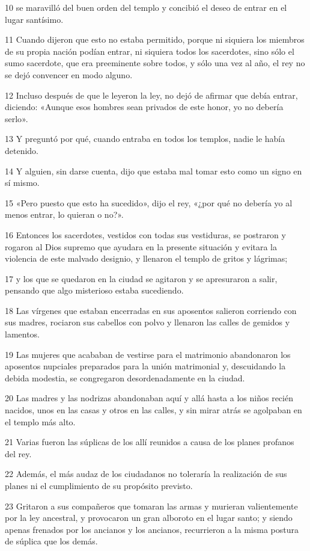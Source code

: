 \par 10 se maravilló del buen orden del templo y concibió el deseo de entrar en el lugar santísimo.
\par 11 Cuando dijeron que esto no estaba permitido, porque ni siquiera los miembros de su propia nación podían entrar, ni siquiera todos los sacerdotes, sino sólo el sumo sacerdote, que era preeminente sobre todos, y sólo una vez al año, el rey no se dejó convencer en modo alguno.
\par 12 Incluso después de que le leyeron la ley, no dejó de afirmar que debía entrar, diciendo: «Aunque esos hombres sean privados de este honor, yo no debería serlo».
\par 13 Y preguntó por qué, cuando entraba en todos los templos, nadie le había detenido.
\par 14 Y alguien, sin darse cuenta, dijo que estaba mal tomar esto como un signo en sí mismo.
\par 15 «Pero puesto que esto ha sucedido», dijo el rey, «¿por qué no debería yo al menos entrar, lo quieran o no?».
\par 16 Entonces los sacerdotes, vestidos con todas sus vestiduras, se postraron y rogaron al Dios supremo que ayudara en la presente situación y evitara la violencia de este malvado designio, y llenaron el templo de gritos y lágrimas;
\par 17 y los que se quedaron en la ciudad se agitaron y se apresuraron a salir, pensando que algo misterioso estaba sucediendo.
\par 18 Las vírgenes que estaban encerradas en sus aposentos salieron corriendo con sus madres, rociaron sus cabellos con polvo y llenaron las calles de gemidos y lamentos.
\par 19 Las mujeres que acababan de vestirse para el matrimonio abandonaron los aposentos nupciales preparados para la unión matrimonial y, descuidando la debida modestia, se congregaron desordenadamente en la ciudad.
\par 20 Las madres y las nodrizas abandonaban aquí y allá hasta a los niños recién nacidos, unos en las casas y otros en las calles, y sin mirar atrás se agolpaban en el templo más alto.
\par 21 Varias fueron las súplicas de los allí reunidos a causa de los planes profanos del rey.
\par 22 Además, el más audaz de los ciudadanos no toleraría la realización de sus planes ni el cumplimiento de su propósito previsto.
\par 23 Gritaron a sus compañeros que tomaran las armas y murieran valientemente por la ley ancestral, y provocaron un gran alboroto en el lugar santo; y siendo apenas frenados por los ancianos y los ancianos, recurrieron a la misma postura de súplica que los demás.
